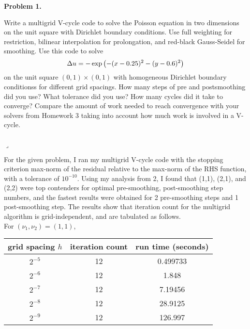 \documentclass[12pt]{article}
\newenvironment{myprob}[1]
    {%
    \noindent{\Huge$\ulcorner$}\textbf{#1.}\begin{em}
    }
    { 
    \end{em} \\ \hphantom{l} \hfill {\Huge$\lrcorner$} }
\begin{document}
\rhead{\today}

{\let\newpage\relax} 


\begin{myprob}{Problem 1}
Write a multigrid V-cycle code to solve the Poisson equation in two dimensions on the unit square with Dirichlet boundary conditions. Use full weighting for restriction, bilinear interpolation for prolongation, and red-black Gauss-Seidel for smoothing.
Use this code to solve
$$\Delta u = -\exp\qty( - (x-0.25)^2 - (y-0.6)^2)$$
on the unit square $(0, 1) \times (0, 1)$ with homogeneous Dirichlet boundary conditionss for different grid spacings. How many steps of pre and postsmoothing did you use? What tolerance did you use? How many cycles did it take to converge? Compare the amount of work needed to reach convergence with your solvers from Homework 3 taking into account how much work is involved in a V-cycle.
\end{myprob}

For the given problem, I ran my multigrid V-cycle code with the stopping criterion
max-norm of the residual relative to the max-norm of the RHS function, with a tolerance of $10^{-10}$. Using my analysis from 2, I found that (1,1), (2,1), and (2,2) were top contenders for optimal pre-smoothing, post-smoothing step numbers, and the fastest results were obtained for 2 pre-smoothing steps and 1 post-smoothing step. The results show that iteration count for the multigrid algorithm is grid-independent, and are tabulated as follows. \\
For $(\nu_1, \nu_2) = (1,1)$,  \\
\begin{center}
\begin{tabular}{||c|c|c||}
\hline \hline
   grid spacing $h$ &   iteration count &   run time (seconds) \\
\hline \hline
       $2^{-5}$    &                12 &             0.499733 \\
       $2^{-6}$   &                12 &             1.848    \\
       $2^{-7}$  &                12 &             7.19456  \\
       $2^{-8}$ &                12 &            28.9125   \\
       $2^{-9}$ & 12 & 126.997 \\
\hline \hline
\end{tabular}
\end{center}
\end{document}
